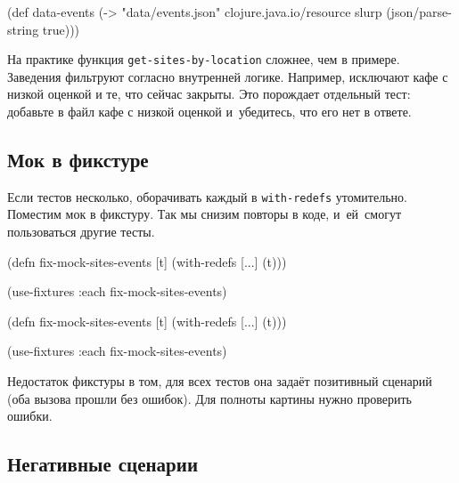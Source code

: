 \begin{english}
  \begin{clojure}
(def data-events
  (-> "data/events.json"
      clojure.java.io/resource
      slurp
      (json/parse-string true)))
  \end{clojure}
\end{english}

\mnoindent
На практике функция \verb|get-sites-by-location| сложнее, чем в
примере. Заведения фильтруют согласно внутренней логике. Например, исключают
кафе с низкой оценкой и те, что сейчас закрыты. Это порождает отдельный тест:
добавьте в файл кафе с низкой оценкой и~убедитесь, что его нет в ответе.

\subsection{Мок в фикстуре}


Если тестов несколько, оборачивать каждый в \verb|with-redefs|
утомительно. Поместим мок в фикстуру. Так мы снизим повторы в коде, и~ей~смогут
пользоваться другие тесты.

\ifnarrow

\begin{english}
  \begin{clojure}
(defn fix-mock-sites-events [t]
  (with-redefs [...]
    (t)))

(use-fixtures :each
  fix-mock-sites-events)
  \end{clojure}
\end{english}

\else

\begin{english}
  \begin{clojure}
(defn fix-mock-sites-events [t]
  (with-redefs [...]
    (t)))

(use-fixtures :each fix-mock-sites-events)
  \end{clojure}
\end{english}

\fi

Недостаток фикстуры в том, для всех тестов она задаёт позитивный сценарий (оба
вызова прошли без ошибок). Для полноты картины нужно проверить ошибки.

\subsection{Негативные сценарии}

